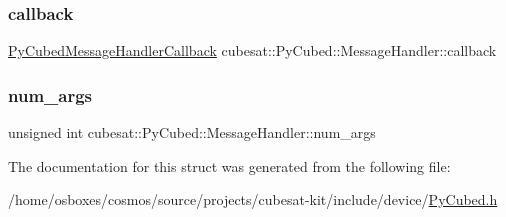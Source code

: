 \subsubsection{\texorpdfstring{callback}{callback}}
{\footnotesize\ttfamily \hyperlink{namespacecubesat_a3b98f17d41bf0e37fe0d382b897f9692}{Py\+Cubed\+Message\+Handler\+Callback} cubesat\+::\+Py\+Cubed\+::\+Message\+Handler\+::callback}

\mbox{\label{structcubesat_1_1PyCubed_1_1MessageHandler_a42724ac13a929837460a2d1923f47514}} 
\subsubsection{\texorpdfstring{num\+\_\+args}{num\_args}}
{\footnotesize\ttfamily unsigned int cubesat\+::\+Py\+Cubed\+::\+Message\+Handler\+::num\+\_\+args}



The documentation for this struct was generated from the following file\+:\begin{DoxyCompactItemize}
\item 
/home/osboxes/cosmos/source/projects/cubesat-\/kit/include/device/\hyperlink{PyCubed_8h}{Py\+Cubed.\+h}\end{DoxyCompactItemize}

